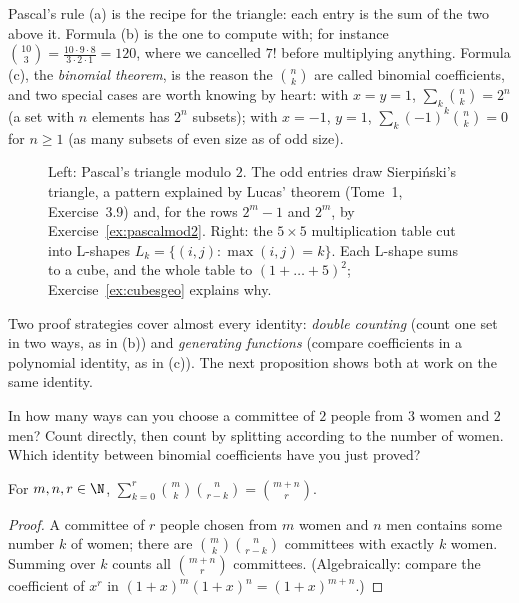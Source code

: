 Pascal's rule (a) is the recipe for the triangle: each entry is the sum of the two above it. Formula (b) is the one to compute with; for instance
$\binom{10}3=\frac{10\cdot9\cdot8}{3\cdot2\cdot1}=120$, where we cancelled $7!$ before multiplying anything. Formula (c), the \emph{binomial theorem},
is the reason the $\binom nk$ are called binomial coefficients, and two special cases are worth knowing by heart: with $x=y=1$,
$\sum_k\binom nk=2^n$ (a set with $n$ elements has $2^n$ subsets); with $x=-1$, $y=1$, $\sum_k(-1)^k\binom nk=0$ for $n\ge1$ (as many subsets of
even size as of odd size).

\begin{figure}[ht]
\centering
{}
\caption{Left: Pascal's triangle modulo $2$. The odd entries draw Sierpi\'nski's triangle, a pattern explained by Lucas' theorem (Tome~1, Exercise~3.9) and, for the rows $2^m-1$ and $2^m$, by Exercise~\ref{ex:pascalmod2}. Right: the $5\times5$ multiplication table cut into L-shapes $L_k=\{(i,j):\max(i,j)=k\}$. Each L-shape sums to a cube, and the whole table to $(1+\dots+5)^2$; Exercise~\ref{ex:cubesgeo} explains why.}
\label{fig:pascal}
\end{figure}

Two proof strategies cover almost every identity: \emph{double counting} (count one set in two ways, as in (b))
and \emph{generating functions} (compare coefficients in a polynomial identity, as in (c)). The next proposition shows both at work on the same identity.

\begin{think}
In how many ways can you choose a committee of $2$ people from $3$ women and $2$ men? Count directly, then count by splitting according to the number of women. Which identity between binomial coefficients have you just proved?
\end{think}

\begin{proposition}[Vandermonde]\label{prop:vandermonde}
For $m,n,r\in\N$, $\displaystyle\sum_{k=0}^{r}\binom mk\binom n{r-k}=\binom{m+n}r$.
\end{proposition}
\begin{proof}
A committee of $r$ people chosen from $m$ women and $n$ men contains some number $k$ of women;
there are $\binom mk\binom n{r-k}$ committees with exactly $k$ women. Summing over $k$ counts all
$\binom{m+n}r$ committees. (Algebraically: compare the coefficient of $x^r$ in $(1+x)^m(1+x)^n=(1+x)^{m+n}$.)
\end{proof}

